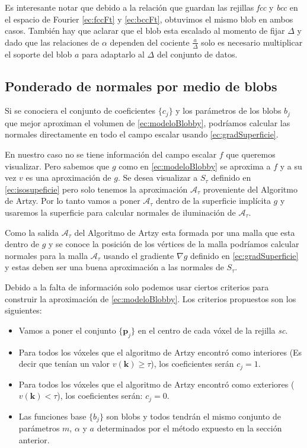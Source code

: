 Es interesante notar que debido a la relación que guardan las rejillas \emph{fcc} y \emph{bcc} en el espacio de Fourier \eqref{ec:fccFt} y \eqref{ec:bccFt}, obtuvimos el mismo blob en ambos casos. También hay que aclarar que el blob esta escalado al momento de fijar $\Delta$ y dado que las relaciones de $\alpha$ dependen del cociente $\frac{a}{\Delta}$ solo es necesario multiplicar el soporte del blob $a$ para adaptarlo al $\Delta$ del conjunto de datos.

\subsection{Ponderado de normales por medio de blobs}
\label{sec:ponderadoNormalesBlobs}
Si se conociera el conjunto de coeficientes $\{ c_j \}$ y los parámetros de los blobs $b_j$ que mejor aproximan el volumen de \eqref{ec:modeloBlobby}, podríamos calcular las normales directamente en todo el campo escalar usando \eqref{ec:gradSuperficie}. 

En nuestro caso no se tiene información del campo escalar $f$ que queremos visualizar. Pero sabemos que $g$ como en \eqref{ec:modeloBlobby} se aproxima a $f$ y a su vez $v$ es una aproximación de $g$.  Se desea visualizar a $S_{\tau}$ definido en \eqref{ec:isosupeficie} pero solo tenemos la aproximación $\mathcal{A}_{\tau}$ proveniente del Algoritmo de Artzy. Por lo tanto vamos a poner $\mathcal{A}_{\tau}$ dentro de la superficie implícita $g$ y usaremos la superficie para calcular normales de iluminación de $\mathcal{A}_{\tau}$.

Como la salida $\mathcal{A}_{\tau}$ del Algoritmo de Artzy esta formada por una malla que esta dentro de $g$ y se conoce la posición de los vértices de la malla podríamos calcular normales para la malla $\mathcal{A}_{\tau}$ usando el gradiente $\nabla g$ definido en \eqref{ec:gradSuperficie} y estas deben ser una buena aproximación a las normales de $S_{\tau}$.

Debido a la falta de información solo podemos usar ciertos criterios para construir la aproximación de \eqref{ec:modeloBlobby}. Los criterios propuestos son los siguientes:

\begin{itemize}
  \item Vamos a poner el conjunto $\{ \textbf{p}_j \}$ en el centro de cada vóxel de la rejilla \emph{sc}.
  \item Para todos los vóxeles que el algoritmo de Artzy encontró como interiores (Es decir que tenían un valor $v(\textbf{k}) \geq \tau$), los coeficientes serán $c_j = 1$.
  \item Para todos los vóxeles que el algoritmo de Artzy encontró como exteriores ($v(\textbf{k}) < \tau$), los coeficientes serán: $c_j = 0$.
  \item Las funciones base $\{ b_j \}$ son blobs y todos tendrán el mismo conjunto de parámetros $m$, $\alpha$ y $a$ determinados por el método expuesto en la sección anterior.
\end{itemize}

